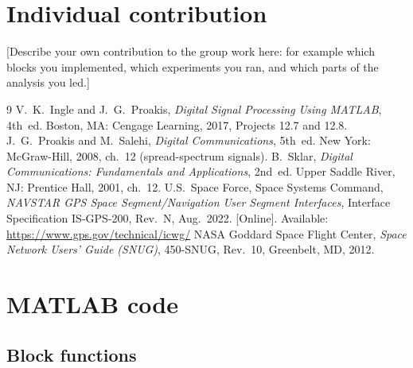 \documentclass[11pt,a4paper]{article}
\begin{document}
\section*{Individual contribution}
[Describe your own contribution to the group work here: for example which blocks you
implemented, which experiments you ran, and which parts of the analysis you led.]

\begin{thebibliography}{9}
 V.~K.~Ingle and J.~G.~Proakis, \emph{Digital Signal Processing
  Using MATLAB}, 4th~ed. Boston, MA: Cengage Learning, 2017, Projects 12.7 and 12.8.
 J.~G.~Proakis and M.~Salehi, \emph{Digital Communications},
  5th~ed. New York: McGraw-Hill, 2008, ch.~12 (spread-spectrum signals).
 B.~Sklar, \emph{Digital Communications: Fundamentals and
  Applications}, 2nd~ed. Upper Saddle River, NJ: Prentice Hall, 2001, ch.~12.
 U.S.~Space Force, Space Systems Command, \emph{NAVSTAR GPS Space
  Segment/Navigation User Segment Interfaces}, Interface Specification IS-GPS-200,
  Rev.~N, Aug.~2022. [Online]. Available: \url{https://www.gps.gov/technical/icwg/}
 NASA Goddard Space Flight Center, \emph{Space Network Users' Guide
  (SNUG)}, 450-SNUG, Rev.~10, Greenbelt, MD, 2012.
\end{thebibliography}

\appendix
\section{MATLAB code}\label{app:code}

\subsection*{Block functions}







\end{document}
